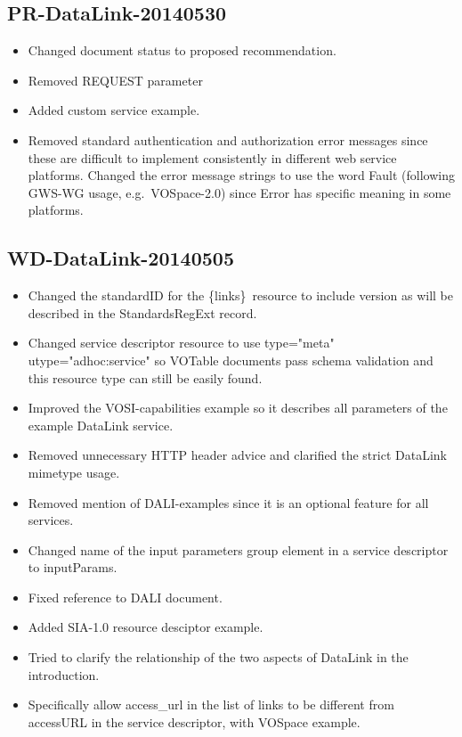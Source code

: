 \documentclass[11pt,a4paper]{ivoa}
\newcommand{\blinks}{\{links\}}
\newcommand{\attval}[2]{#1={\allowbreak}{"}#2{"}}
\begin{document}
\subsection{PR-DataLink-20140530}

\begin{itemize}
\item
Changed document status to proposed recommendation.
\item
Removed REQUEST parameter
\item
Added custom service example.
\item
Removed standard authentication and authorization error messages since
these are difficult to implement consistently in different web service
platforms. Changed the error message strings to use the word Fault
(following GWS-WG usage, e.g.\ VOSpace-2.0) since Error has specific
meaning in some platforms.
\end{itemize}


\subsection{WD-DataLink-20140505}

\begin{itemize}
\item
Changed the standardID for the \blinks\ resource to include version as
will be described in the StandardsRegExt record.
\item
Changed service descriptor resource to use
\attval{type}{meta} \attval{utype}{adhoc:service}
so VOTable documents pass schema validation and this resource type can
still be easily found.
\item
Improved the VOSI-capabilities example so it describes all parameters
of the example DataLink service.
\item
Removed unnecessary HTTP header advice and clarified the strict DataLink
mimetype usage.
\item
Removed mention of DALI-examples since it is an optional feature for
all services.
\item
Changed name of the input parameters group element in a service descriptor
to inputParams.
\item
Fixed reference to DALI document.
\item
Added SIA-1.0 resource desciptor example.
\item
Tried to clarify the relationship of the two aspects of DataLink in
the introduction.
\item
Specifically allow access\_url in the list of links to be different from
accessURL in the service descriptor, with VOSpace example.
\end{itemize}
\end{document}
